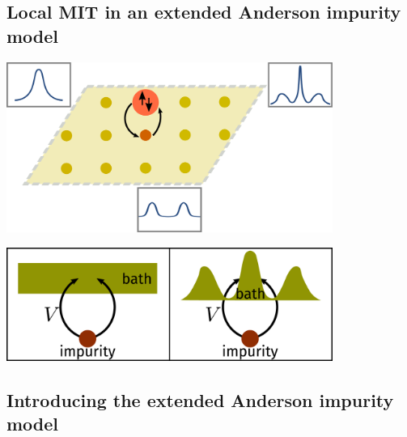 \documentclass[8pt,aspectratio=169]{beamer}
\begin{document}
\begin{frame}{}
\section{Local MIT in an extended Anderson impurity model}

\begin{minipage}{0.5\textwidth}
\includegraphics[width=0.8\textwidth]{DMFT.pdf}
\end{minipage}
\hspace*{\fill}
\begin{minipage}{0.45\textwidth}
\includegraphics[width=0.8\textwidth]{dos_diff.pdf}
\end{minipage}

\end{frame}

\begin{frame}{}
\section{Introducing the extended Anderson impurity model}
\end{frame}
\end{document}
